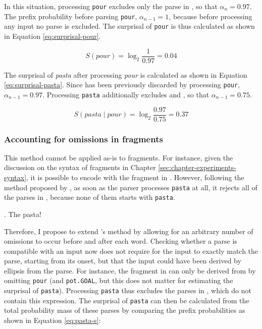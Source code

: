 In this situation, processing \texttt{pour} excludes only the parse in \Last[c], so that $\alpha_{n} = 0.97$. The prefix probability before parsing \texttt{pour}, $\alpha_{n-1} = 1$, because before processing any input no parse is excluded. The surprisal of \texttt{pour} is thus calculated as shown in Equation \ref{eq:surprisal-pour}.

\begin{equation}
 \displaystyle S(pour) = \log_2 \frac{1}{0.97} = 0.04 \label{eq:surprisal-pour}
\end{equation}

The surprisal of \textit{pasta} after processing \textit{pour} is calculated as shown in Equation \ref{eq:surprisal-pasta}. Since \Last[c] has been previously discarded by processing \texttt{pour}, $\alpha_{n-1} = 0.97$. Processing \texttt{pasta} additionally excludes \Last[b] and \Last[d], so that $\alpha_{n-1} = 0.75$.

\begin{equation}
 \displaystyle S(pasta\mathbin{|}pour) = \log_2 \frac{0.97}{0.75} = 0.37 \label{eq:surprisal-pasta}
\end{equation}

\subsubsection{Accounting for omissions in fragments}     

This method cannot be applied as-is to fragments. For instance, given the discussion on the syntax of fragments in Chapter \ref{sec:chapter-experiments-syntax}, it is possible to encode \Last[a] with the fragment in \Next. However, following the method proposed by \citet{hale2001}, as soon as the parser processes \texttt{pasta} at all, it rejects all of the parses in \Last, because none of them starts with \texttt{pasta}. 

\ex. The pasta!

Therefore, I propose to extend \citeauthor{hale2001}'s method by allowing for an arbitrary number of omissions to occur before and after each word. Checking whether a parse is compatible with an input now does not require for the input to exactly match the parse, starting from its onset, but that the input could have been derived by ellipsis from the parse. For instance, the fragment in \Last can only be derived from \LLast[a] by omitting \texttt{pour} (and \texttt{pot.GOAL}, but this does not matter for estimating the surprisal of \texttt{pasta}). Processing \texttt{pasta} thus excludes the parses in \LLast[b--d], which do not contain this expression. The surprisal of \texttt{pasta} can then be calculated from the total probability mass of these parses by comparing the prefix probabilities as shown in Equation \ref{eq:pasta-s}:

